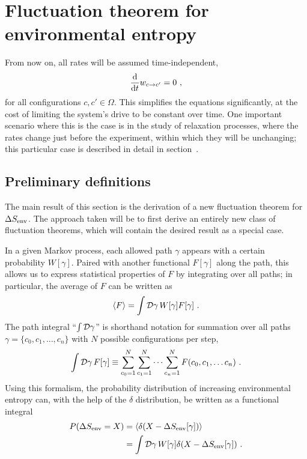 \section{Fluctuation theorem for environmental entropy}


From now on, all rates will be assumed time-independent,
\begin{equation}
	\frac{\mathrm{d} }{\mathrm{d} t}w_{c\to c'} = 0 ~,
\end{equation}
%
for all configurations \(c, c'\in\Omega\). This simplifies the equations significantly, at the cost of limiting the system's drive to be constant over time. One important scenario where this is the case is in the study of relaxation processes, where the rates change just before the experiment, within which they will be unchanging; this particular case is described in detail in section~.



\subsection{Preliminary definitions}

The main result of this section is the derivation of a new fluctuation theorem for \(\Delta S_\text{env}\). The approach taken will be to first derive an entirely new class of fluctuation theorems, which will contain the desired result as a special case.

In a given Markov process, each allowed path \(\gamma\) appears with a certain probability \(W[\gamma]\). Paired with another functional \(F[\gamma]\) along the path, this allows us to express statistical properties of \(F\) by integrating over all paths; in particular, the average of \(F\) can be written as
%
\begin{align}
	\label{eqn:functional average}
	\langle F\rangle = \int \mathcal{D} \gamma\, W[\gamma] F[\gamma] ~.
\end{align}
%
The path integral ``\(\int \mathcal{D}\gamma\)'' is shorthand notation for summation over all paths \(\gamma = \{c_0, c_1, \ldots, c_n\}\) with \(N\) possible configurations per step,
%
\begin{align}
	\int \mathcal{D}\gamma \, F[\gamma]
	\equiv
	\sum_{c_0=1}^N\sum_{c_1=1}^N\cdots\sum_{c_n=1}^N F(c_0, c_1, \ldots c_n) ~.
\end{align}
%
Using this formalism, the probability distribution of increasing environmental entropy can, with the help of the \(\delta\) distribution, be written as a functional integral
%
\begin{equation}
	\begin{split}
	P(\Delta S_\text{env} = X)
	&= \langle \delta(X-\Delta S_\text{env}[\gamma])\rangle \\
	&= \int\mathcal{D}\gamma \, W[\gamma] \delta(X-\Delta S_\text{env}[\gamma])
	~.
	\end{split}
\end{equation}

